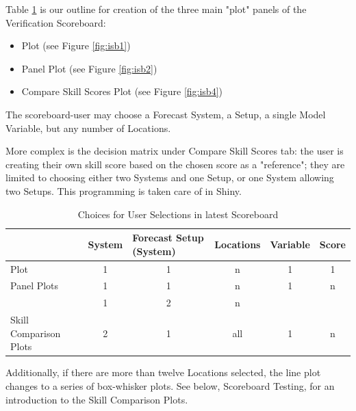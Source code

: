 \documentclass[logos,parttoc,morelanguage=french,morelanguage=german,draft]{orsay-memoire}
\begin{document}
Table \ref{tbl:selectOptions2} is our outline for creation of the three main "plot" panels of the Verification Scoreboard: 
\begin{itemize}
\item Plot (see Figure \ref{fig:isb1})
\item Panel Plot (see Figure \ref{fig:isb2})
\item Compare Skill Scores Plot  (see Figure \ref{fig:isb4})
\end{itemize}

The \gls{scoreboard-user} may choose a Forecast System, a Setup, a single Model Variable, but any number of Locations.

More complex is the decision matrix under Compare Skill Scores tab: the user is creating their own skill score based on the chosen score as a "reference"; they are limited to choosing either two Systems and one Setup, or one System allowing two Setups. This programming is taken care of in Shiny.

\begin{table}[h]
\centering
\begin{tabular}{@{}lccccc@{}}
\toprule
 & \multicolumn{1}{l}{System} & \multicolumn{1}{l}{Forecast Setup (System)} & \multicolumn{1}{l}{Locations} & \multicolumn{1}{l}{Variable} & \multicolumn{1}{l}{Score} \\ \midrule
Plot & \cellcolor[HTML]{FFFFFF}1 & \cellcolor[HTML]{FFFFFF}1 & \cellcolor[HTML]{FFFFFF}n & \cellcolor[HTML]{FFFFFF}1 & \cellcolor[HTML]{FFFFFF}1 \\
Panel Plots & \cellcolor[HTML]{FFFFFF}1 & \cellcolor[HTML]{FFFFFF}1 & \cellcolor[HTML]{FFFFFF}n & \cellcolor[HTML]{FFFFFF}1 & \cellcolor[HTML]{FFFFFF}n \\
 & \cellcolor[HTML]{FFFFFF}1 & \cellcolor[HTML]{CBCEFB}2 & \cellcolor[HTML]{FFFFFF}n & \cellcolor[HTML]{FFFFFF} & \cellcolor[HTML]{FFFFFF} \\
\multirow{-2}{*}{Skill Comparison Plots} & \cellcolor[HTML]{CBCEFB}2 & \cellcolor[HTML]{FFFFFF}1 & \cellcolor[HTML]{CBCEFB}all & \multirow{-2}{*}{\cellcolor[HTML]{FFFFFF}1} & \multirow{-2}{*}{\cellcolor[HTML]{FFFFFF}n} \\ \cmidrule(lr){2-4}
\end{tabular}
\caption{Choices for User Selections in latest Scoreboard}
\label{tbl:selectOptions2}
\end{table}

Additionally, if there are more than twelve Locations selected, the line plot changes to a series of box-whisker plots. See below, Scoreboard Testing, for an introduction to the Skill Comparison Plots.
\end{document}
